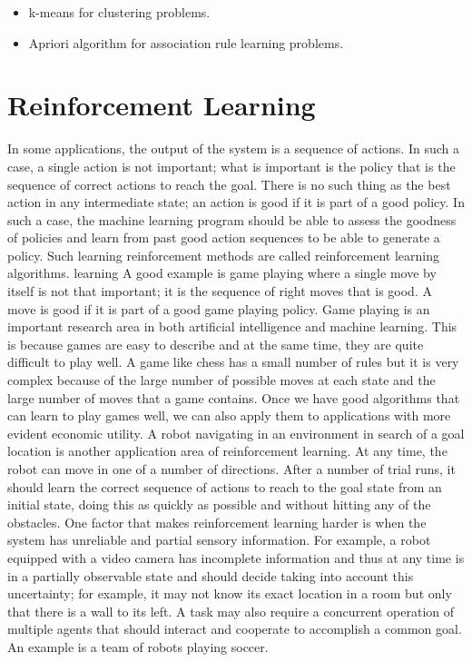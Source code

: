 \begin{itemize}
  \item k-means for clustering problems.
  \item Apriori algorithm for association rule learning problems.
\end{itemize}

\par

\section{Reinforcement Learning }

In some applications, the output of the system is a sequence of actions. In such a case, a single action is not important; what is important is the policy that is the sequence of correct actions to reach the goal. There is no such thing as the best action in any intermediate state; an action is good if it is part of a good policy. In such a case, the machine learning program should be able to assess the goodness of policies and learn from past good action sequences to be able to generate a policy. Such learning reinforcement methods are called reinforcement learning algorithms.
learning A good example is game playing where a single move by itself is not that important; it is the sequence of right moves that is good. A move is good if it is part of a good game playing policy. Game playing is an important research area in both artificial intelligence and machine learning. This is because games are easy to describe and at the same time, they are quite difficult to play well. A game like chess has a small number of rules but it is very complex because of the large number of possible moves at each state and the large number of moves that a game contains. Once we have good algorithms that can learn to play games well, we can also apply them to applications with more evident economic utility.
A robot navigating in an environment in search of a goal location is
another application area of reinforcement learning. At any time, the robot can move in one of a number of directions. After a number of trial runs, it should learn the correct sequence of actions to reach to the goal state from an initial state, doing this as quickly as possible and without hitting any of the obstacles.
One factor that makes reinforcement learning harder is when the system
has unreliable and partial sensory information. For example, a robot
equipped with a video camera has incomplete information and thus at
any time is in a partially observable state and should decide taking into account this uncertainty; for example, it may not know its exact location in a room but only that there is a wall to its left. A task may also  require a concurrent operation of multiple agents that should interact and   cooperate to accomplish a common goal. An example is a team of robots playing soccer.

